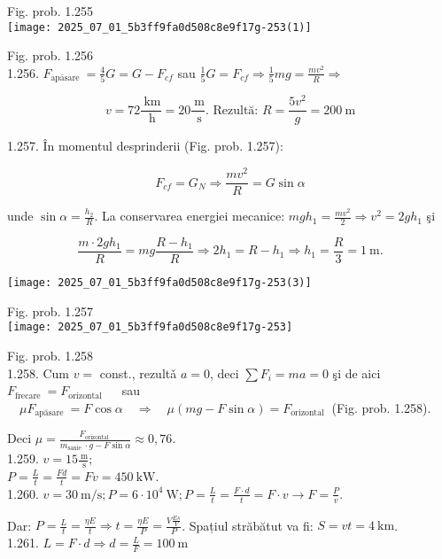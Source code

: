 Fig. prob. 1.255\\
\texttt{[image: 2025\_07\_01\_5b3ff9fa0d508c8e9f17g-253(1)]}

Fig. prob. 1.256\\
1.256. $F_{\text {apäsare }}=\frac{4}{5} G=G-F_{c f}$ sau $\frac{1}{5} G=F_{c f} \Rightarrow \frac{1}{5} m g=\frac{m v^{2}}{R} \Rightarrow$

$$
v=72 \frac{\mathrm{~km}}{\mathrm{~h}}=20 \frac{\mathrm{~m}}{\mathrm{~s}} . \text { Rezultă: } R=\frac{5 v^{2}}{g}=200 \mathrm{~m}
$$

1.257. În momentul desprinderii (Fig. prob. 1.257):

$$
F_{c f}=G_{N} \Rightarrow \frac{m v^{2}}{R}=G \sin \alpha
$$

unde $\sin \alpha=\frac{h_{2}}{R}$. La conservarea energiei mecanice: $m g h_{1}=\frac{m v^{2}}{2} \Rightarrow v^{2}=2 g h_{1}$ şi

$$
\frac{m \cdot 2 g h_{1}}{R}=m g \frac{R-h_{1}}{R} \Rightarrow 2 h_{1}=R-h_{1} \Rightarrow h_{1}=\frac{R}{3}=1 \mathrm{~m} .
$$

\begin{center}
\texttt{[image: 2025\_07\_01\_5b3ff9fa0d508c8e9f17g-253(3)]}
\end{center}

Fig. prob. 1.257\\
\texttt{[image: 2025\_07\_01\_5b3ff9fa0d508c8e9f17g-253]}

Fig. prob. 1.258\\
1.258. Cum $v=$ const., rezultǎ $a=0$, deci $\sum F_{i}=m a=0$ şi de aici $F_{\text {frecare }}=F_{\text {orizontal }} \quad$ sau $\quad \mu F_{\text {apăsare }}=F \cos \alpha \quad \Rightarrow \quad \mu(m g-F \sin \alpha)=F_{\text {orizontal }}$ (Fig. prob. 1.258).

Deci $\mu=\frac{F_{\text {orizontal }}}{m_{\text {sanie }} \cdot g-F \sin \alpha} \approx 0,76$.\\
1.259. $v=15 \frac{\mathrm{~m}}{\mathrm{~s}}$;\\
$P=\frac{L}{t}=\frac{F d}{t}=F v=450 \mathrm{~kW}$.\\
1.260. $v=30 \mathrm{~m} / \mathrm{s} ; P=6 \cdot 10^{4} \mathrm{~W} ; P=\frac{L}{t}=\frac{F \cdot d}{t}=F \cdot v \rightarrow F=\frac{P}{v}$.

Dar: $P=\frac{L}{t}=\frac{\eta E}{t} \Rightarrow t=\frac{\eta E}{P}=\frac{V \frac{E s}{V}}{P}$. Spațiul străbătut va fi: $S=v t=4 \mathrm{~km}$.\\
1.261. $L=F \cdot d \Rightarrow d=\frac{L}{F}=100 \mathrm{~m}$

